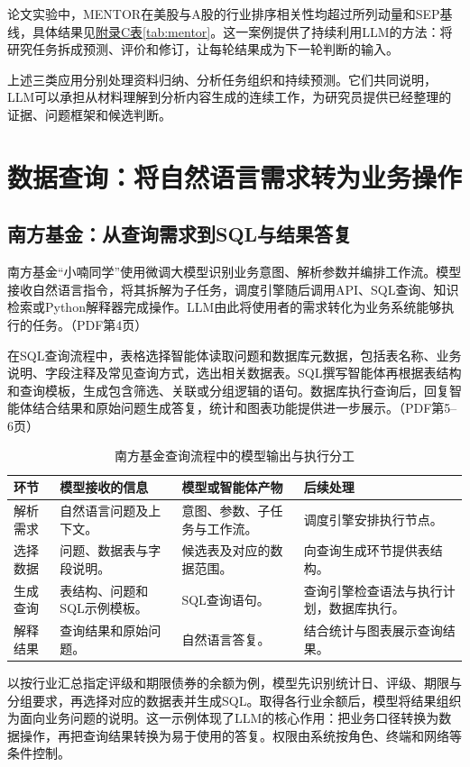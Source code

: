 \documentclass[11pt,a4paper,fontset=none]{ctexart}
\begin{document}
论文实验中，MENTOR在美股与A股的行业排序相关性均超过所列动量和SEP基线，具体结果见\hyperref[tab:mentor]{附录C表\ref*{tab:mentor}}。这一案例提供了持续利用LLM的方法：将研究任务拆成预测、评价和修订，让每轮结果成为下一轮判断的输入。

上述三类应用分别处理资料归纳、分析任务组织和持续预测。它们共同说明，LLM可以承担从材料理解到分析内容生成的连续工作，为研究员提供已经整理的证据、问题框架和候选判断。

\section{数据查询：将自然语言需求转为业务操作}
\subsection{南方基金：从查询需求到SQL与结果答复}
南方基金“小喃同学”使用微调大模型识别业务意图、解析参数并编排工作流。模型接收自然语言指令，将其拆解为子任务，调度引擎随后调用API、SQL查询、知识检索或Python解释器完成操作。LLM由此将使用者的需求转化为业务系统能够执行的任务。（PDF第4页）

在SQL查询流程中，表格选择智能体读取问题和数据库元数据，包括表名称、业务说明、字段注释及常见查询方式，选出相关数据表。SQL撰写智能体再根据表结构和查询模板，生成包含筛选、关联或分组逻辑的语句。数据库执行查询后，回复智能体结合结果和原始问题生成答复，统计和图表功能提供进一步展示。（PDF第5--6页）

\begin{table}[H]\small\centering
\caption{南方基金查询流程中的模型输出与执行分工}
\begin{tabularx}{\linewidth}{@{}P{27mm}Y Y Y@{}}\toprule
环节 & 模型接收的信息 & 模型或智能体产物 & 后续处理\\\midrule
解析需求 & 自然语言问题及上下文。 & 意图、参数、子任务与工作流。 & 调度引擎安排执行节点。\\
选择数据 & 问题、数据表与字段说明。 & 候选表及对应的数据范围。 & 向查询生成环节提供表结构。\\
生成查询 & 表结构、问题和SQL示例模板。 & SQL查询语句。 & 查询引擎检查语法与执行计划，数据库执行。\\
解释结果 & 查询结果和原始问题。 & 自然语言答复。 & 结合统计与图表展示查询结果。\\\bottomrule
\end{tabularx}
\end{table}

以按行业汇总指定评级和期限债券的余额为例，模型先识别统计日、评级、期限与分组要求，再选择对应的数据表并生成SQL。取得各行业余额后，模型将结果组织为面向业务问题的说明。这一示例体现了LLM的核心作用：把业务口径转换为数据操作，再把查询结果转换为易于使用的答复。权限由系统按角色、终端和网络等条件控制。
\end{document}
